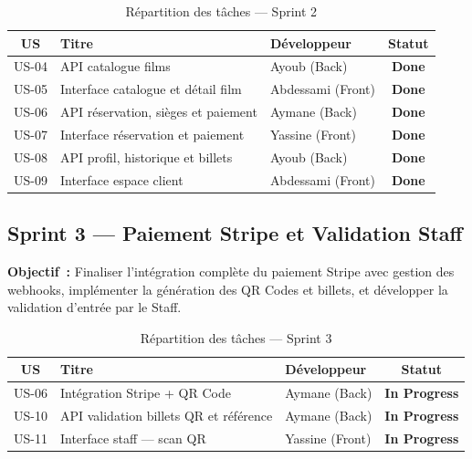 \documentclass[12pt]{report}
\begin{document}
\begin{table}[H]
\centering
\renewcommand{\arraystretch}{1.4}
\begin{tabular}{|c|p{4cm}|l|c|}
\hline
\rowcolor{gray!20}
\textbf{US} & \textbf{Titre} & \textbf{Développeur} & \textbf{Statut} \\
\hline
US-04 & API catalogue films & Ayoub (Back) &
\textcolor{green!60!black}{\textbf{Done}} \\
\hline
US-05 & Interface catalogue et détail film & Abdessami (Front) &
\textcolor{green!60!black}{\textbf{Done}} \\
\hline
US-06 & API réservation, sièges et paiement & Aymane (Back) &
\textcolor{green!60!black}{\textbf{Done}} \\
\hline
US-07 & Interface réservation et paiement & Yassine (Front) &
\textcolor{green!60!black}{\textbf{Done}} \\
\hline
US-08 & API profil, historique et billets & Ayoub (Back) &
\textcolor{green!60!black}{\textbf{Done}} \\
\hline
US-09 & Interface espace client & Abdessami (Front) &
\textcolor{green!60!black}{\textbf{Done}} \\
\hline
\end{tabular}
\caption{Répartition des tâches — Sprint 2}
\label{tab:sprint2}
\end{table}
 
\subsection{Sprint 3 — Paiement Stripe et Validation Staff}
 
\textbf{Objectif~:} Finaliser l'intégration complète du
paiement Stripe avec gestion des webhooks, implémenter
la génération des QR Codes et billets, et développer
la validation d'entrée par le Staff.
 
\begin{table}[H]
\centering
\renewcommand{\arraystretch}{1.4}
\begin{tabular}{|c|p{4cm}|l|c|}
\hline
\rowcolor{gray!20}
\textbf{US} & \textbf{Titre} & \textbf{Développeur} & \textbf{Statut} \\
\hline
US-06 & Intégration Stripe + QR Code & Aymane (Back) &
\textcolor{orange!80!black}{\textbf{In Progress}} \\
\hline
US-10 & API validation billets QR et référence & Aymane (Back) &
\textcolor{orange!80!black}{\textbf{In Progress}} \\
\hline
US-11 & Interface staff — scan QR & Yassine (Front) &
\textcolor{orange!80!black}{\textbf{In Progress}} \\
\hline
\end{tabular}
\caption{Répartition des tâches — Sprint 3}
\label{tab:sprint3}
\end{table}
 
\end{document}
